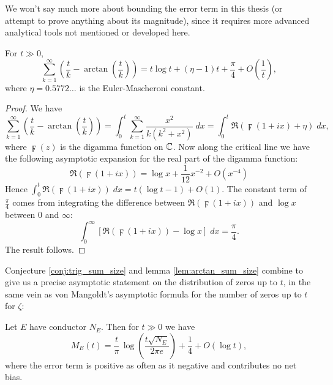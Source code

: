 We won't say much more about bounding the error term in this thesis (or attempt to prove anything about its magnitude), since it requires more advanced analytical tools not mentioned or developed here. \\

\begin{lemma}\label{lem:arctan_sum_size}
For $t \gg 0$, 
\begin{equation}
\sum_{k=1}^{\infty} \left(\frac{t}{k} - \arctan\left(\frac{t}{k}\right)\right) = t\log t + (\eta-1)t + \frac{\pi}{4} + O\left(\frac{1}{t}\right),
\end{equation}
where $\eta = 0.5772\ldots$ is the Euler-Mascheroni constant.
\end{lemma}
\begin{proof}
We have
\begin{equation*}
\sum_{k=1}^{\infty} \left(\frac{t}{k} - \arctan\left(\frac{t}{k}\right)\right) = \int_{0}^{t} \sum_{k=1}^{\infty} \frac{x^2}{k(k^2+x^2)} \; dx = \int_{0}^{t} \Re\left(\digamma(1+ix) + \eta\right) \; dx,
\end{equation*}
where $\digamma(z)$ is the digamma function on $\mathbb{C}$. Now along the critical line we have the following asymptotic expansion for the real part of the digamma function:
\begin{equation}
\Re\left(\digamma(1+ix)\right) = \log x + \frac{1}{12} x^{-2} + O(x^{-4})
\end{equation}
Hence $\int_{0}^{t} \Re\left(\digamma(1+ix)\right) \; dx = t(\log t - 1)  + O(1)$. The constant term of $\frac{\pi}{4}$ comes from integrating the difference between $\Re\left(\digamma(1+ix)\right)$ and $\log x$ between $0$ and $\infty$:
\begin{equation*}
\int_{0}^{\infty} \left[\Re\left(\digamma(1+ix)\right) - \log x\right] \; dx = \frac{\pi}{4}.
\end{equation*}
The result follows.
\end{proof}

Conjecture \ref{conj:trig_sum_size} and lemma \ref{lem:arctan_sum_size} combine to give us a precise asymptotic statement on the distribution of zeros up to $t$, in the same vein as von Mangoldt's asymptotic formula for the number of zeros up to $t$ for $\zeta$:

\begin{theorem}[GRH]\label{thm:zero_density}
Let $E$ have conductor $N_E$. Then for $t\gg0$ we have
\begin{equation}\label{eqn:zero_density}
M_E(t) = \frac{t}{\pi} \, \log\left(\frac{t\sqrt{N_E}}{2\pi e}\right) + \frac{1}{4} + O(\log t),
\end{equation}
where the error term is positive as often as it negative and contributes no net bias.
\end{theorem}

